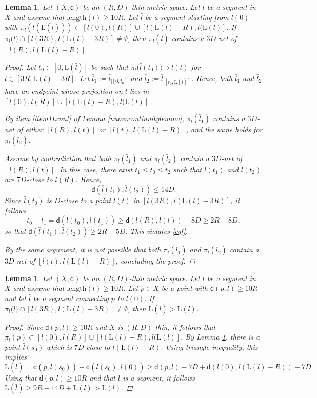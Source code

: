 \documentclass[10pt]{article}
\newtheorem{lemma}[thm]{Lemma}
\theoremstyle{definition}
\newcommand{\length}{\mathrm{L}}
\newcommand{\sd}{\mathsf{d}}
\begin{document}
\begin{lemma} \label{L15}
    Let $(X,\sd)$ be an $(R,D)$-thin metric space.
     Let $l$ be a segment in $X$ and assume that $\mathrm{length}(l) \geq 10R$. Let $\bar{l}$ be a segment starting from $l(0)$ with $\pi_l(\bar{l}(\length(\bar{l}))) \subset [l(0),l(R)] \cup [l(\length(l)-R),l(\length(l)]$. 
     If $\pi_l\big(\bar{l}\big) \cap [l(3R),l(\length(l)-3R)] \neq \emptyset$,
      then $\pi_l(\bar{l})$ contains a $3D$-net of $[l(R),l(\length(l)-R)]$.
     \begin{proof}
         Let $t_0 \in [0,\length(\bar{l})]$ be such that $\pi_l\big(\bar{l}(t_0)\big) \ni l(t)$ for $t \in [3R,\length(l)-3R]$.
Let $\bar{l}_1:=\bar{l}_{|[0,t_0]}$ and $\bar{l}_2:=\bar{l}_{|[t_0,\length(\bar{l})]}$. 
Hence, both $\bar{l}_1$ and $\bar{l}_2$ have an endpoint whose projection on $l$ lies in $[l(0),l(R)] \cup [l(\length(l)-R),l(\length(l)]$.

By item \ref{item1Lcont} of Lemma \ref{nuovocontinuitylemma}, $\pi_l(\bar{l}_1)$ contains a $3D$-net of either $[l(R),l(t)]$ or $[l(t),l(\length(l)-R)]$, and the same holds for $\pi_l(\bar{l}_2)$.

Assume by contradiction that both $\pi_l(\bar{l}_1)$ and $\pi_l(\bar{l}_2)$ contain a $3D$-net of $[l(R),l(t)]$. In this case, there exist $t_1 \leq t_0 \leq t_2$ such that $\bar{l}(t_1)$ and $\bar{l}(t_2)$ are $7D$-close to $l(R)$. Hence,
\begin{equation} \label{eqf}
    \sd(\bar{l}(t_1),\bar{l}(t_2)) \leq 14D.
\end{equation}
Since $\bar{l}(t_0)$ is $D$-close to a point $l(t)$ in $[l(3R),l(\length(l)-3R)]$, it follows
\[
t_0-t_1=\sd(\bar{l}(t_0),\bar{l}(t_1)) \geq  \sd(l(R),l(t))-8D \geq 2R-8D,
\]
so that
$\sd(\bar{l}(t_1),\bar{l}(t_2)) \geq 2R-5D.$ This violates \eqref{eqf}. 

By the same argument, it is not possible that both $\pi_l(\bar{l}_1)$ and $\pi_l(\bar{l}_2)$ contain a $3D$-net of $[l(t),l(\length(l)-R)]$, concluding the proof.
     \end{proof}
\end{lemma}

\begin{lemma} \label{L9}
    Let $(X,\sd)$ be an $(R,D)$-thin metric space.
     Let $l$ be a segment in $X$ and assume that $\mathrm{length}(l) \geq 10R$. Let $p \in X$ be a point with $\sd(p,l) \geq 10R$ and let $\bar{l}$ be a segment connecting $p$ to $l(0)$.
    If $\pi_l\big(\bar{l}\big) \cap [l(3R),l(\length(l)-3R)] \neq \emptyset$, then  $\length(\bar{l}) > \length(l)$.
    \begin{proof}
Since $\sd(p,l) \geq 10R$ and $X$ is $(R,D)$-thin, it follows that $\pi_l(p) \subset [l(0),l(R)] \cup [l(\length(l)-R),l(\length(l)]$.
By Lemma \ref{L15}, there is a point $\bar{l}(s_0)$ which is $7D$-close to $l(\length(l)-R)$. Using triangle inequality, this implies
\[
\length(\bar{l})=\sd(p,\bar{l}(s_0))+\sd(\bar{l}(s_0),l(0)) \geq 
\sd(p,l)-7D+\sd(l(0),l(\length(l)-R))-7D.
\]
Using that $\sd(p,l) \geq 10R$ and that $l$ is a segment, it follows
$
\length(\bar{l}) \geq 9R-14D+\length(l)>\length(l).
$
    \end{proof}
\end{lemma}
\end{document}
